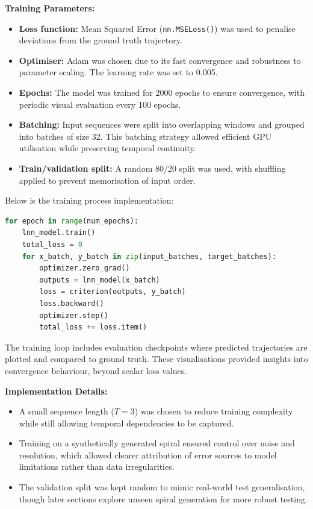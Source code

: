 \vspace{0.5em}
\noindent \textbf{Training Parameters:}
\begin{itemize}
    \item \textbf{Loss function:} Mean Squared Error (\texttt{nn.MSELoss()}) was used to penalise deviations from the ground truth trajectory.
    \item \textbf{Optimiser:} Adam was chosen due to its fast convergence and robustness to parameter scaling. The learning rate was set to 0.005.
    \item \textbf{Epochs:} The model was trained for 2000 epochs to ensure convergence, with periodic visual evaluation every 100 epochs.
    \item \textbf{Batching:} Input sequences were split into overlapping windows and grouped into batches of size 32. This batching strategy allowed efficient GPU utilisation while preserving temporal continuity.
    \item \textbf{Train/validation split:} A random 80/20 split was used, with shuffling applied to prevent memorisation of input order.
\end{itemize}

\vspace{1em}
\noindent Below is the training process implementation:
\begin{lstlisting}[language=Python, caption={Simplified training loop for the LNN}]
for epoch in range(num_epochs):
    lnn_model.train()
    total_loss = 0
    for x_batch, y_batch in zip(input_batches, target_batches):
        optimizer.zero_grad()
        outputs = lnn_model(x_batch)
        loss = criterion(outputs, y_batch)
        loss.backward()
        optimizer.step()
        total_loss += loss.item()
\end{lstlisting}

\vspace{0.5em}
\noindent The training loop includes evaluation checkpoints where predicted trajectories are plotted and compared to ground truth. These visualisations provided insights into convergence behaviour, beyond scalar loss values.

\vspace{1em}
\noindent \textbf{Implementation Details:}
\begin{itemize}
    \item A small sequence length ($T = 3$) was chosen to reduce training complexity while still allowing temporal dependencies to be captured.
    \item Training on a synthetically generated spiral ensured control over noise and resolution, which allowed clearer attribution of error sources to model limitations rather than data irregularities.
    \item The validation split was kept random to mimic real-world test generalisation, though later sections explore unseen spiral generation for more robust testing.
\end{itemize}

